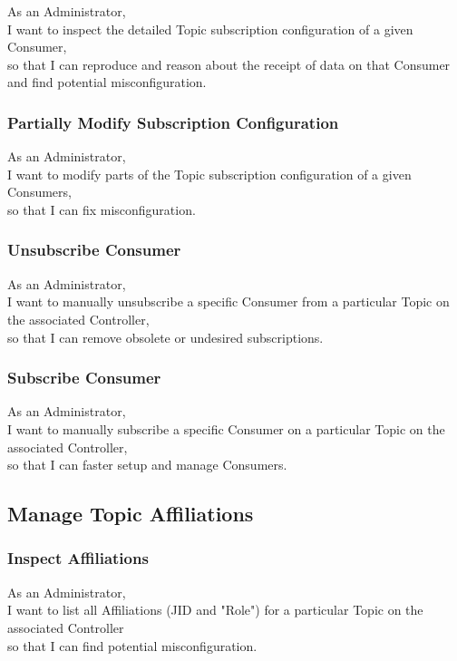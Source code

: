 As an Administrator, \\
I want to inspect the detailed Topic subscription configuration of a given Consumer, \\
so that I can reproduce and reason about the receipt of data on that Consumer
and find potential misconfiguration.

\subsubsection{Partially Modify Subscription Configuration}

As an Administrator, \\
I want to modify parts of the Topic subscription configuration of a given Consumers, \\
so that I can fix misconfiguration.

\subsubsection{Unsubscribe Consumer}

As an Administrator, \\
I want to manually unsubscribe a specific Consumer from a particular Topic on the associated Controller, \\
so that I can remove obsolete or undesired subscriptions.

\subsubsection{Subscribe Consumer}

As an Administrator, \\
I want to manually subscribe a specific Consumer on a particular Topic on the associated Controller, \\
so that I can faster setup and manage Consumers.

\subsection{Manage Topic Affiliations}
\subsubsection{Inspect Affiliations}

As an Administrator,\\
I want to list all Affiliations (JID and "Role") for a particular Topic on the associated Controller \\
so that I can find potential misconfiguration.

